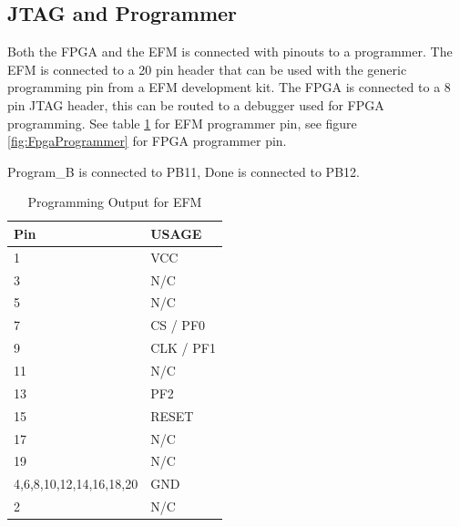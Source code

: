 \subsection{JTAG and Programmer}
Both the FPGA and the EFM is connected with pinouts to a programmer. The EFM is connected to a 20 pin header that can be used with the generic programming pin from a EFM development kit. 
The FPGA is connected to a 8 pin JTAG header, this can be routed to a debugger used for FPGA programming.  See table \ref{tab:EfmProgrammer} for EFM programmer pin, see figure \ref{fig:FpgaProgrammer} for FPGA programmer pin.

Program\_B is connected to PB11, Done is connected to PB12.
\begin{table}[]
    \centering
    \begin{tabular}{ll}
        Pin                     & USAGE     \\
        \hline
        1                       & VCC       \\
        3                       & N/C       \\
        5                       & N/C       \\
        7                       & CS / PF0  \\
        9                       & CLK / PF1 \\
        11                      & N/C       \\
        13                      & PF2       \\
        15                      & RESET     \\
        17                      & N/C       \\
        19                      & N/C       \\
        4,6,8,10,12,14,16,18,20 & GND       \\
        2                       & N/C
    \end{tabular}
    \caption{Programming Output for EFM}
    \label{tab:EfmProgrammer}
\end{table}

